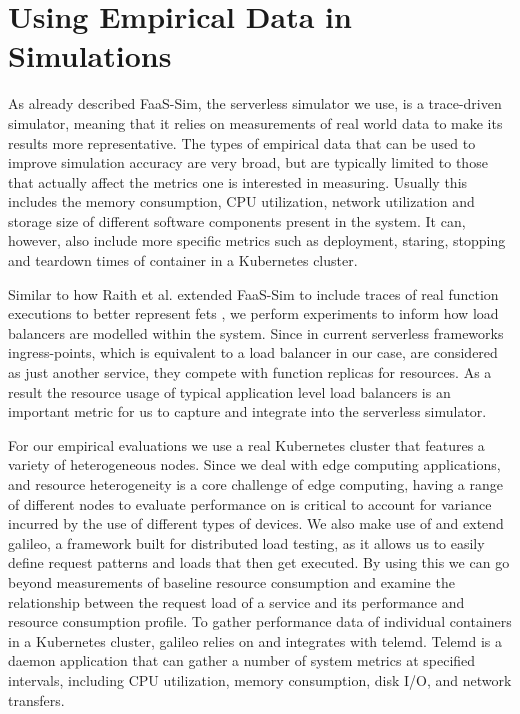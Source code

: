 \documentclass[draft,final]{vutinfth} %
\begin{document}
\section{Using Empirical Data in Simulations}
As already described FaaS-Sim\cite{faas-sim-github}, the serverless simulator we use, is a trace-driven simulator\cite{thomas-thesis}, meaning that it relies on measurements of real world data to make its results more representative.
The types of empirical data that can be used to improve simulation accuracy are very broad, but are typically limited to those that actually affect the metrics one is interested in measuring.
Usually this includes the memory consumption, CPU utilization, network utilization and storage size of different software components present in the system.
It can, however, also include more specific metrics such as deployment, staring, stopping and teardown times of container in a Kubernetes cluster\cite{skippy}.

Similar to how Raith et al. extended FaaS-Sim to include traces of real function executions to better represent \glspl{fet} \cite{philipp-da}, we perform experiments to inform how load balancers are modelled within the system.
Since in current serverless frameworks ingress-points, which is equivalent to a load balancer in our case, are considered as just another service, they compete with function replicas for resources.
As a result the resource usage of typical application level load balancers is an important metric for us to capture and integrate into the serverless simulator.

For our empirical evaluations we use a real Kubernetes cluster that features a variety of heterogeneous nodes.
Since we deal with edge computing applications, and resource heterogeneity is a core challenge of edge computing\cite{shiEdgeComputingVisionChallenges2016}, having a range of different nodes to evaluate performance on is critical to account for variance incurred by the use of different types of devices.
We also make use of and extend galileo\cite{galileo-github}\cite{operating-energy-aware-galileo}, a framework built for distributed load testing, as it allows us to easily define request patterns and loads that then get executed.
By using this we can go beyond measurements of baseline resource consumption and examine the relationship between the request load of a service and its performance and resource consumption profile.
To gather performance data of individual containers in a Kubernetes cluster, galileo relies on and integrates with telemd\cite{telemd-github}.
Telemd is a daemon application that can gather a number of system metrics at specified intervals, including CPU utilization, memory consumption, disk I/O, and network transfers.
\end{document}
